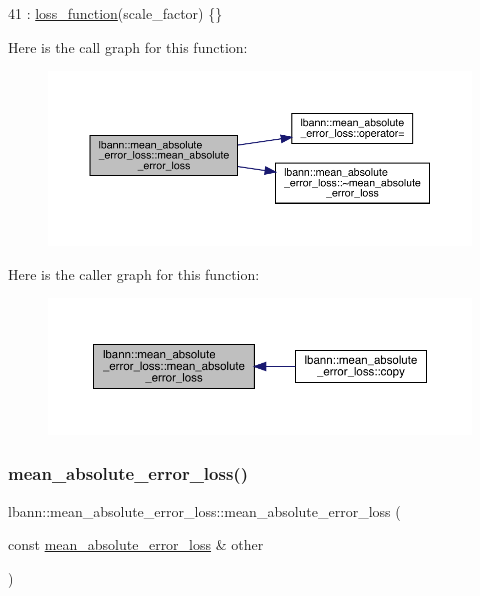 \begin{DoxyCode}
41     : \hyperlink{classlbann_1_1loss__function_a0c5745e661c59e3e5496888d233c07cf}{loss\_function}(scale\_factor) \{\}
\end{DoxyCode}
Here is the call graph for this function\+:\nopagebreak
\begin{figure}[H]
\begin{center}
\leavevmode
\includegraphics[width=350pt]{classlbann_1_1mean__absolute__error__loss_a80845866345cf8c4daba645683022bc2_cgraph}
\end{center}
\end{figure}
Here is the caller graph for this function\+:\nopagebreak
\begin{figure}[H]
\begin{center}
\leavevmode
\includegraphics[width=350pt]{classlbann_1_1mean__absolute__error__loss_a80845866345cf8c4daba645683022bc2_icgraph}
\end{center}
\end{figure}
\mbox{\label{classlbann_1_1mean__absolute__error__loss_a7f151beb5f22ccb0d35979184f48a366}} 
\subsubsection{\texorpdfstring{mean\+\_\+absolute\+\_\+error\+\_\+loss()}{mean\_absolute\_error\_loss()}\hspace{0.1cm}{\footnotesize\ttfamily [2/2]}}
{\footnotesize\ttfamily lbann\+::mean\+\_\+absolute\+\_\+error\+\_\+loss\+::mean\+\_\+absolute\+\_\+error\+\_\+loss (\begin{DoxyParamCaption}\item[{const \hyperlink{classlbann_1_1mean__absolute__error__loss}{mean\+\_\+absolute\+\_\+error\+\_\+loss} \&}]{other }\end{DoxyParamCaption})\hspace{0.3cm}{\ttfamily [default]}}

